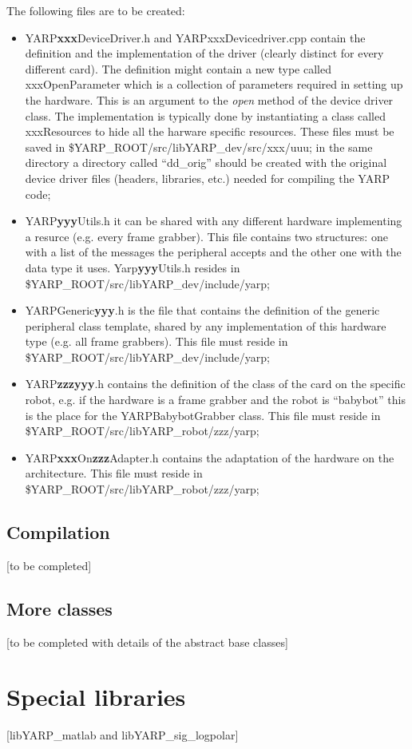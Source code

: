 The following files are to be created:
\begin{itemize}

\item YARP{\bf xxx}DeviceDriver.h and YARPxxxDevicedriver.cpp contain the definition and the implementation of the driver (clearly distinct for every different card). The definition might contain a new type called xxxOpenParameter which is a collection of parameters required in setting up the hardware. This is an argument to the {\em open} method of the device driver class. The implementation is typically done by instantiating a class called xxxResources to hide all the harware specific resources. These files must be saved in \$YARP\_ROOT/src/libYARP\_dev/src/xxx/uuu; in the same directory a directory called ``dd\_orig'' should be created with the original device driver files (headers, libraries, etc.) needed for compiling the YARP code;

\item YARP{\bf yyy}Utils.h it can be shared with any different hardware implementing a resurce (e.g. every frame grabber). This file contains two structures: one with a list of the messages the peripheral accepts and the other one with the data type it uses. Yarp{\bf yyy}Utils.h resides in \$YARP\_ROOT/src/libYARP\_dev/include/yarp;

\item YARPGeneric{\bf yyy}.h is the file that contains the definition of the generic peripheral class template, shared by any implementation of this hardware type (e.g. all frame grabbers). This file must reside in \$YARP\_ROOT/src/libYARP\_dev/include/yarp;


\item YARP{\bf zzzyyy}.h contains the definition of the class of the card on the specific robot, e.g. if the hardware is a frame grabber and the robot is ``babybot'' this is the place for the YARPBabybotGrabber class. This file must reside in \$YARP\_ROOT/src/libYARP\_robot/zzz/yarp;

\item YARP{\bf xxx}On{\bf zzz}Adapter.h contains the adaptation of the hardware on the architecture. This file must reside in \$YARP\_ROOT/src/libYARP\_robot/zzz/yarp;

\end{itemize}


\subsection{Compilation}
[to be completed]


\subsection{More classes}
[to be completed with details of the abstract base classes]


\section{Special libraries}
[libYARP\_matlab and libYARP\_sig\_logpolar]